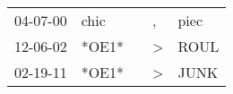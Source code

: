 \begin{supertabular}{p{0.07\textwidth}p{0.06\textwidth}p{0.02\textwidth}p{0.02\textwidth}p{0.06\textwidth}}
 04-07-00\textsuperscript{} &  chic\textsuperscript{} &   &             , &  piec\textsuperscript{} \\
 12-06-02\textsuperscript{} &                   *OE1* &   &  \textgreater &  ROUL\textsuperscript{} \\
 02-19-11\textsuperscript{} &                   *OE1* &   &  \textgreater &  JUNK\textsuperscript{} \\
\end{supertabular}
